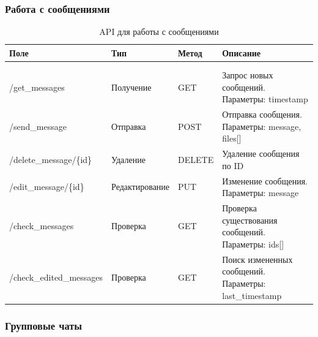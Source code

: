 \subsubsection{Работа с сообщениями}

\begin{xltabular}{\textwidth}{|l|l|p{1.7cm}|X|}
	\caption{API для работы с сообщениями}\label{tab:messages_api} \\ \hline
	\centrow Поле & \centrow Тип & \centrow Метод & \centrow Описание \\ \hline
	 &  &  &  \\ \hline
	\endfirsthead
	 &  &  &  \\ \hline
	\finishhead
	/get\_messages & Получение & GET & Запрос новых сообщений. Параметры: timestamp \\ \hline 
	/send\_message & Отправка & POST & Отправка сообщения. Параметры: message, files[] \\ \hline 
	/delete\_message/\{id\} & Удаление & DELETE & Удаление сообщения по ID \\ \hline 
	/edit\_message/\{id\} & Редактирование & PUT & Изменение сообщения. Параметры: message \\ \hline 
	/check\_messages & Проверка & GET & Проверка существования сообщений. Параметры: ids[] \\ \hline 
	/check\_edited\_messages & Проверка & GET & Поиск измененных сообщений. Параметры: last\_timestamp \\ \hline 
\end{xltabular}
\newpage
\subsubsection{Групповые чаты}

